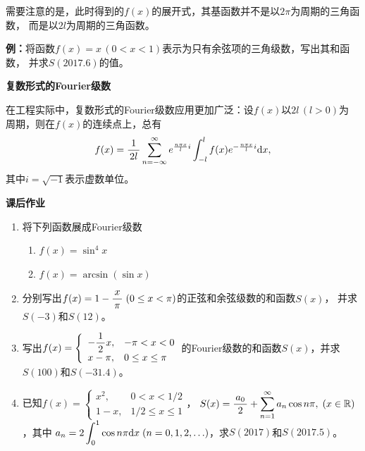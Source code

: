 需要注意的是，此时得到的$f(x)$的展开式，其基函数并不是以$2\pi$为周期的三角函数，
而是以$2l$为周期的三角函数。

{\bf 例：}将函数$f(x)=x\,(0<x<1)$表示为只有余弦项的三角级数，写出其和函数，
并求$S(2017.6)$的值。

\begin{shaded}
	{\bf 复数形式的Fourier级数}
	
	在工程实际中，复数形式的Fourier级数应用更加广泛：设$f(x)$以$2l\,(l>0)$为
	周期，则在$f(x)$的连续点上，总有
	$$f(x)=\df1{2l}\sumn[-\infty]e^{\frac{n\pi x}li}
	\dint_{-l}^lf(x)e^{-\frac{n\pi x}li}\d x,$$
	其中$i=\sqrt{-1}$表示虚数单位。
\end{shaded}

\begin{ext}
	{\bf 课后作业}
	\begin{enumerate}
	  \item 将下列函数展成Fourier级数
		\begin{enumerate}[(1)]
		  \item $f(x)=\sin^4x$
		  \item $f(x)=\arcsin(\sin x)$
		\end{enumerate}
	  \item 分别写出$f(x)=1-\df{x}{\pi}\;(0\leq x<\pi)$的正弦和余弦级数的和函数$S(x)$，
		并求$S(-3)$和$S(12)$。
	  \item 写出$f(x)=\left\{\begin{array}{ll}
			-\df12x,&-\pi<x<0\\ x-\pi,&0\leq x\leq \pi
		\end{array}\right.$的Fourier级数的和函数$S(x)$，并求$S(100)$和$S(-31.4)$。
	  \item 已知$f(x)=\left\{\begin{array}{ll}
			x^2,&0<x<1/2\\ 1-x,&1/2\leq x\leq 1
		\end{array}\right.$，
		$S(x)=\df{a_0}2+\sumn a_n\cos n\pi,\;(x\in\mathbb{R})$，其中
		$a_n=2\dint_0^1\cos n\pi\d x\;(n=0,1,2,\ldots)$，求$S(2017)$和$S(2017.5)$。
	\end{enumerate}
\end{ext}

